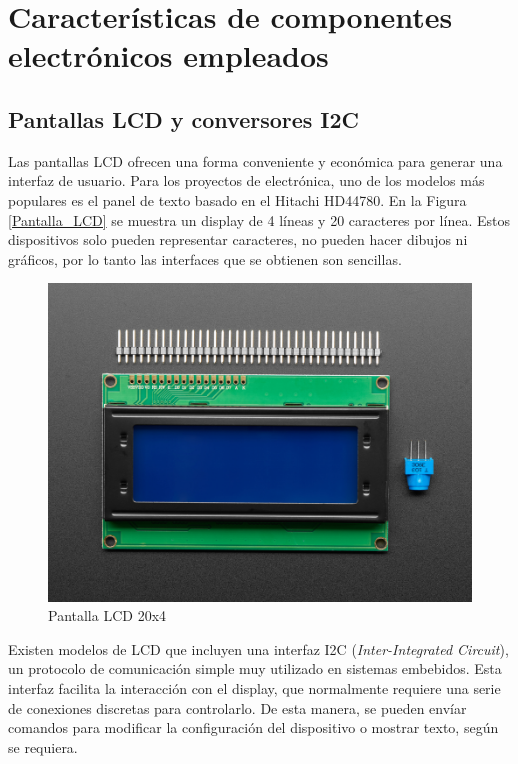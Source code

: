 \section{Características de componentes electrónicos empleados}

\subsection{Pantallas LCD y conversores I2C}
\label{seccion_display_led}

Las pantallas LCD ofrecen una forma conveniente y económica para generar una interfaz de usuario. Para los proyectos de electrónica, uno de los modelos más populares es el panel de texto basado en el Hitachi HD44780\citep{Arduino_Cookbook}. En la Figura \ref{Pantalla_LCD} se muestra un display de 4 líneas y 20 caracteres por línea. Estos dispositivos solo pueden representar caracteres, no pueden hacer dibujos ni gráficos, por lo tanto las interfaces que se obtienen son sencillas.

\begin{figure}[htbp]
	\centering
	\includegraphics[scale=1.5]{./Figures/LCD.jpg}
	\caption{Pantalla LCD 20x4\protect\footnotemark}
	\label{fig:Pantalla_LCD}
\end{figure}


Existen modelos de LCD que incluyen una interfaz I2C (\textit{Inter-Integrated Circuit}), un protocolo de comunicación simple muy utilizado en sistemas embebidos. Esta interfaz facilita la interacción con el display, que normalmente requiere una serie de conexiones discretas para controlarlo. De esta manera, se pueden envíar comandos para modificar la configuración del dispositivo o mostrar texto, según se requiera.

